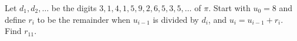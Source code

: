 Let $d_1,d_2,\ldots$ be the digits $3,1,4,1,5,9,2,6,5,3,5,\ldots$ of $\pi$. Start with $u_0=8$ and define $r_i$ to be the remainder when $u_{i-1}$ is divided by $d_i$, and $u_i=u_{i-1}+r_i$. Find $r_{11}$.

